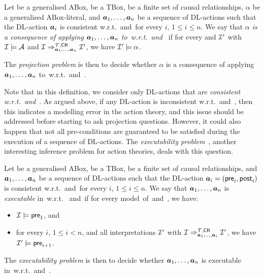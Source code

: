 \begin{definition}\label{def:projection}
    Let \Amc be a generalised ABox, \Tmc be a TBox, \CR be a finite set of
    causal relationships, $\alpha$ be a generalised ABox-literal, and
    $\boldsymbol a_1,\dots,\boldsymbol a_n$ be a sequence of DL-actions such that the DL-action
    $\boldsymbol a_i$ is consistent w.r.t.~\Tmc and~\CR for every $i$, $1\le i\le n$.
    We say that \emph{$\alpha$ is a consequence of applying
    $\boldsymbol a_1,\dots,\boldsymbol a_n$ to~\Amc w.r.t.~\Tmc and~\CR} if for every \Imc and
    $\mathcal{I}'$ with $\mathcal{I}\models\mathcal{A}$ and
    $\mathcal{I}\Rightarrow_{\boldsymbol a_1,\dots,\boldsymbol a_n}^{\mathcal{T},\mathsf{CR}}\mathcal{I}'$, we have
    $\mathcal{I}'\models\alpha$.

    The \emph{projection problem} is then to decide whether $\alpha$ is a
    consequence of applying $\boldsymbol a_1,\dots,\boldsymbol a_n$ to~\Amc w.r.t.~\Tmc and~\CR.
\end{definition}

\noindent
Note that in this definition, we consider only DL-actions that are
\emph{consistent w.r.t.~\Tmc and~\CR}.  As argued above, if any DL-action is
inconsistent w.r.t.~\Tmc and~\CR, then this indicates a modelling error in the
action theory, and this issue should be addressed before starting to ask
projection questions.  However, it could also happen that not all pre-conditions
are guaranteed to be satisfied during the execution of a sequence of DL-actions.
The \emph{executability problem}~\cite{Rei-01}, another interesting inference
problem for action theories, deals with this question.

\begin{definition}\label{def:executability}
    Let \Amc be a generalised ABox, \Tmc be a TBox, \CR be a finite set of
    causal relationships, and $\boldsymbol a_1,\dots,\boldsymbol a_n$ be a sequence of DL-actions
    such that the DL-action $\boldsymbol a_i=(\mathsf{pre}_i,\mathsf{post}_i)$ is consistent
    w.r.t.~\Tmc and~\CR for every $i$, $1\le i\le n$.
    We say that $\boldsymbol a_1,\dots,\boldsymbol a_n$ is \emph{executable} in~\Amc w.r.t.~\Tmc
    and~\CR if for every model~\Imc of~\Amc and~\Tmc, we have:
    \begin{itemize}
        \item $\mathcal{I}\models\mathsf{pre}_1$, and
        \item for every $i$, $1\le i<n$, and all interpretations $\mathcal{I}'$ with
            $\mathcal{I}\Rightarrow_{\boldsymbol a_1,\dots,\boldsymbol a_i}^{\mathcal{T},\mathsf{CR}}\mathcal{I}'$, we have
            $\mathcal{I}'\models\mathsf{pre}_{i+1}$.
    \end{itemize}
    The \emph{executability problem} is then to decide whether
    $\boldsymbol a_1,\dots,\boldsymbol a_n$ is executable in~\Amc w.r.t.~\Tmc and~\CR.
\end{definition}

